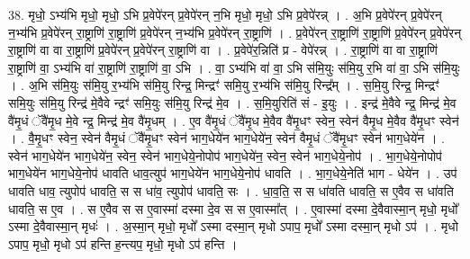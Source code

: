 \documentclass[17pt]{extarticle}
\begin{document}
38. मृधो॒ ऽभ्य॑भि मृधो॒ मृधो॒ ऽभि प्र॒वेपे॑रन् प्र॒वेपे॑रन् न॒भि मृधो॒ मृधो॒ ऽभि प्र॒वेपे॑रन्न् । . अ॒भि प्र॒वेपे॑रन् प्र॒वेपे॑रन् न॒भ्य॑भि प्र॒वेपे॑रन् रा॒ष्ट्राणि॑ रा॒ष्ट्राणि॑ प्र॒वेपे॑रन् न॒भ्य॑भि प्र॒वेपे॑रन् रा॒ष्ट्राणि॑ । . प्र॒वेपे॑रन् रा॒ष्ट्राणि॑ रा॒ष्ट्राणि॑ प्र॒वेपे॑रन् प्र॒वेपे॑रन् रा॒ष्ट्राणि॑ वा वा रा॒ष्ट्राणि॑ प्र॒वेपे॑रन् प्र॒वेपे॑रन् रा॒ष्ट्राणि॑ वा । . प्र॒वेपे॑र॒न्निति॑ प्र - वेपे॑रन्न् । . रा॒ष्ट्राणि॑ वा वा रा॒ष्ट्राणि॑ रा॒ष्ट्राणि॑ वा॒ ऽभ्य॑भि वा॑ रा॒ष्ट्राणि॑ रा॒ष्ट्राणि॑ वा॒ ऽभि । . वा॒ ऽभ्य॑भि वा॑ वा॒ ऽभि स॑मि॒युः स॑मि॒यु र॒भि वा॑ वा॒ ऽभि स॑मि॒युः । . अ॒भि स॑मि॒युः स॑मि॒यु र॒भ्य॑भि स॑मि॒यु रिन्द्र॒ मिन्द्रꣳ॑ समि॒यु र॒भ्य॑भि स॑मि॒यु रिन्द्र᳚म् । . स॒मि॒यु रिन्द्र॒ मिन्द्रꣳ॑ समि॒युः स॑मि॒यु रिन्द्र॑ मे॒वैवे न्द्रꣳ॑ समि॒युः स॑मि॒यु रिन्द्र॑ मे॒व । . स॒मि॒युरिति॑ सं - इ॒युः । . इन्द्र॑ मे॒वैवे न्द्र॒ मिन्द्र॑ मे॒व वै॑मृ॒धं ॅवै॑मृ॒ध मे॒वे न्द्र॒ मिन्द्र॑ मे॒व वै॑मृ॒धम् । . ए॒व वै॑मृ॒धं ॅवै॑मृ॒ध मे॒वैव वै॑मृ॒धꣳ स्वेन॒ स्वेन॑ वैमृ॒ध मे॒वैव वै॑मृ॒धꣳ स्वेन॑ । . वै॒मृ॒धꣳ स्वेन॒ स्वेन॑ वैमृ॒धं ॅवै॑मृ॒धꣳ स्वेन॑ भाग॒धेये॑न भाग॒धेये॑न॒ स्वेन॑ वैमृ॒धं ॅवै॑मृ॒धꣳ स्वेन॑ भाग॒धेये॑न । . स्वेन॑ भाग॒धेये॑न भाग॒धेये॑न॒ स्वेन॒ स्वेन॑ भाग॒धेये॒नोपोप॑ भाग॒धेये॑न॒ स्वेन॒ स्वेन॑ भाग॒धेये॒नोप॑ । . भा॒ग॒धेये॒नोपोप॑ भाग॒धेये॑न भाग॒धेये॒नोप॑ धावति धाव॒त्युप॑ भाग॒धेये॑न भाग॒धेये॒नोप॑ धावति । . भा॒ग॒धेये॒नेति॑ भाग - धेये॑न । . उप॑ धावति धाव॒ त्युपोप॑ धावति॒ स स धा॑व॒ त्युपोप॑ धावति॒ सः । . धा॒व॒ति॒ स स धा॑वति धावति॒ स ए॒वैव स धा॑वति धावति॒ स ए॒व । . स ए॒वैव स स ए॒वास्मा॑ दस्मा दे॒व स स ए॒वास्मा᳚त् । . ए॒वास्मा॑ दस्मा दे॒वैवास्मा॒न् मृधो॒ मृधो᳚ ऽस्मा दे॒वैवास्मा॒न् मृधः॑ । . अ॒स्मा॒न् मृधो॒ मृधो᳚ ऽस्मा दस्मा॒न् मृधो ऽपाप॒ मृधो᳚ ऽस्मा दस्मा॒न् मृधो ऽप॑ । . मृधो ऽपाप॒ मृधो॒ मृधो ऽप॑ हन्ति ह॒न्त्यप॒ मृधो॒ मृधो ऽप॑ हन्ति । \newline
\pagebreak
{}
\end{document}
